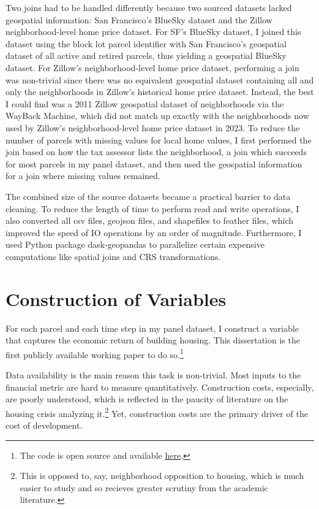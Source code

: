 \documentclass[a4paper,12pt]{article}
\begin{document}
Two joins had to be handled differently because two sourced datasets lacked geospatial information: San Francisco’s BlueSky dataset and the Zillow neighborhood-level home price dataset. For SF’s BlueSky dataset, I joined this dataset using the block lot parcel identifier with San Francisco’s geospatial dataset of all active and retired parcels, thus yielding a geospatial BlueSky dataset. For Zillow’s neighborhood-level home price dataset, performing a join was non-trivial since there was no equivalent geospatial dataset containing all and only the neighborhoods in Zillow’s historical home price dataset. Instead, the best I could find was a 2011 Zillow geospatial dataset of neighborhoods via the WayBack Machine, which did not match up exactly with the neighborhoods now used by Zillow’s neighborhood-level home price dataset in 2023. To reduce the number of parcels with missing values for local home values, I first performed the join based on how the tax assessor lists the neighborhood, a join which succeeds for most parcels in my panel dataset, and then used the geospatial information for a join where missing values remained.

The combined size of the source datasets became a practical barrier to data cleaning. To reduce the length of time to perform read and write operations, I also converted all csv files, geojson files, and shapefiles to feather files, which improved the speed of IO operations by an order of magnitude. Furthermore, I used Python package dask-geopandas to parallelize certain expensive computations like spatial joins and CRS transformations.


\section{Construction of Variables}
\label{con.var}
For each parcel and each time step in my panel dataset, I construct a variable that captures the economic return of building housing. This dissertation is the first publicly available working paper to do so.\footnote{The code is open source and available \href{https://github.com/sdamerdji/dissertation}{here}.}

Data availability is the main reason this task is non-trivial. Most inputs to the financial metric are hard to measure quantitatively. Construction costs, especially, are poorly understood, which is reflected in the paucity of literature on the housing crisis analyzing it.\footnote{This is opposed to, say, neighborhood opposition to housing, which is much easier to study and so recieves greater scrutiny from the academic literature.} Yet, construction costs are the primary driver of the cost of development.
\end{document}
